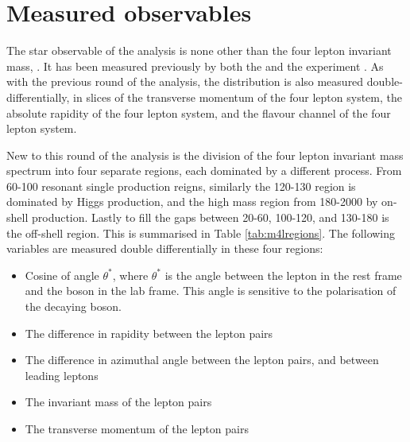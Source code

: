 \section{Measured observables}

The star observable of the analysis is none other than the four lepton invariant mass, \mFourL. It has been measured previously by both the \ATLAS and the \CMS experiment  \cite{}. As with the previous round of the analysis, the \mFourL distribution is also measured double-differentially, in slices of the transverse momentum of the four lepton system, the absolute rapidity of the four lepton system, and the flavour channel of the four lepton system. 

New to this round of the analysis is the division of the four lepton invariant mass spectrum into four separate regions, each dominated by a different process. From \unit{60}{\GeV}-\unit{100}{\GeV} resonant single \Z production reigns, similarly the \unit{120}{\GeV}-\unit{130}{\GeV} region is dominated by Higgs production, and the high mass region from \unit{180}{\GeV}-\unit{2000}{\GeV} by on-shell \ZZ production. Lastly to fill the gaps between  \unit{20}{\GeV}-\unit{60}{\GeV}, \unit{100}{\GeV}-\unit{120}{\GeV}, and \unit{130}{\GeV}-\unit{180}{\GeV} is the off-shell \ZZ region. This is summarised in Table \ref{tab:m4lregions}. The following variables are measured double differentially in these four regions:

\begin{itemize}
    \item Cosine of angle $\theta^{*}$, where $\theta^{*}$ is the angle between the  lepton in the rest frame and the \Z boson in the lab frame. This angle is sensitive to the polarisation of the decaying boson.
    \item The difference in rapidity between the lepton pairs
    \item The difference in azimuthal angle between the lepton pairs, and between leading leptons
    \item The invariant mass of the lepton pairs
    \item The transverse momentum of the lepton pairs
\end{itemize}

